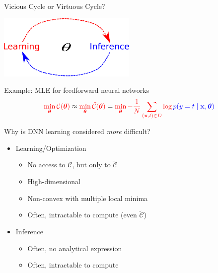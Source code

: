 \documentclass[first=dgreen,second=purple,logo=yellowexc]{aaltoslides}
\newcommand{\vect}[1]{\mathbf{#1}}
\newcommand{\vects}[1]{\boldsymbol{#1}}
\newcommand{\vx}[0]{\vect{x}}
\newcommand{\TT}[0]{{\vects{\theta}}}
\newcommand{\CC}[0]{\mathcal{C}}
\newcommand{\tred}[1]{\textcolor{red}{#1}}
\newcommand{\tblue}[1]{\textcolor{blue}{#1}}
\begin{document}
\begin{frame}{Vicious Cycle or Virtuous Cycle?}

        \centering
        \includegraphics[width=0.5\textwidth]{vicious_cycle.pdf}

    \vfill
    \raggedright
    Example: MLE for feedforward neural networks
    \begin{align*}
        {\color{red} \min_{\TT} \CC(\TT)} \approx 
        {\color{red} \min_{\TT} \tilde{\CC}(\TT)} =
        {\color{red} \min_{\TT} -\frac{1}{N}\sum_{\left(\vx,t\right) \in D}
        \log {\color{blue}p(y=t \mid \vx, \TT)}}
    \end{align*}

\end{frame}

\begin{frame}{Why is DNN learning considered \emph{more}
    difficult?}
    \begin{itemize}
        \item Learning/Optimization 
            \begin{itemize}
                \item No access to $\CC$, but only to $\tilde{\CC}$
                \item High-dimensional
                \item Non-convex with multiple local minima
                \item Often, intractable to compute (even $\tilde{\CC}$)
            \end{itemize}
        \item Inference
            \begin{itemize}
                \item Often, no analytical expression
                \item Often, intractable to compute
            \end{itemize}
    \end{itemize}
\end{frame}
\end{document}

